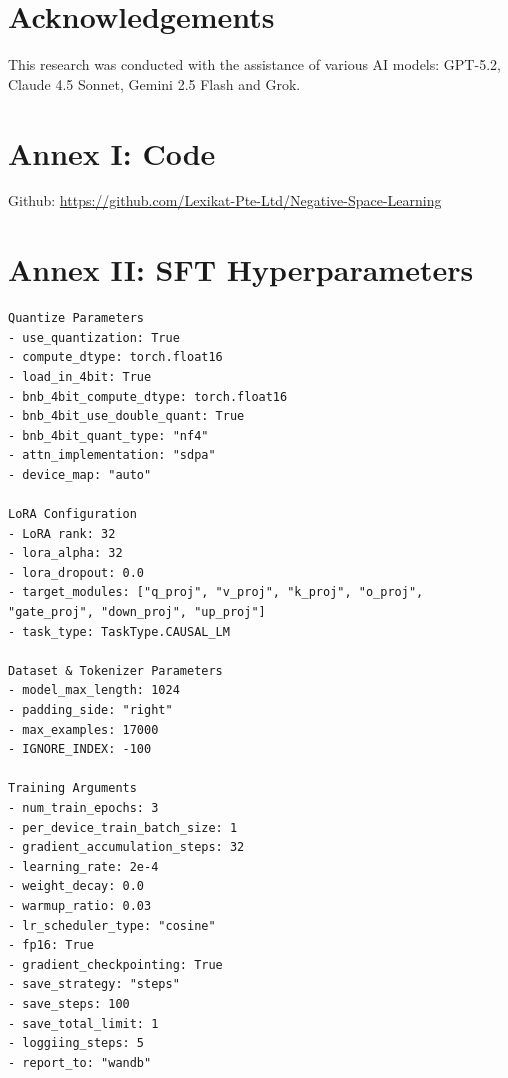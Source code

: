 \documentclass{article}
\begin{document}
\section{Acknowledgements}
This research was conducted with the assistance of various AI models: GPT-5.2, Claude 4.5 Sonnet, Gemini 2.5 Flash and Grok.

\section{Annex I: Code}
Github: \url{https://github.com/Lexikat-Pte-Ltd/Negative-Space-Learning}

\section{Annex II: SFT Hyperparameters}
\begin{verbatim}
Quantize Parameters
- use_quantization: True
- compute_dtype: torch.float16
- load_in_4bit: True
- bnb_4bit_compute_dtype: torch.float16
- bnb_4bit_use_double_quant: True
- bnb_4bit_quant_type: "nf4"
- attn_implementation: "sdpa"
- device_map: "auto" 

LoRA Configuration
- LoRA rank: 32
- lora_alpha: 32
- lora_dropout: 0.0
- target_modules: ["q_proj", "v_proj", "k_proj", "o_proj", 
"gate_proj", "down_proj", "up_proj"]
- task_type: TaskType.CAUSAL_LM

Dataset & Tokenizer Parameters
- model_max_length: 1024
- padding_side: "right"
- max_examples: 17000
- IGNORE_INDEX: -100

Training Arguments
- num_train_epochs: 3
- per_device_train_batch_size: 1
- gradient_accumulation_steps: 32
- learning_rate: 2e-4
- weight_decay: 0.0
- warmup_ratio: 0.03
- lr_scheduler_type: "cosine"
- fp16: True
- gradient_checkpointing: True
- save_strategy: "steps"
- save_steps: 100
- save_total_limit: 1
- loggiing_steps: 5
- report_to: "wandb"

\end{verbatim}
\end{document}
